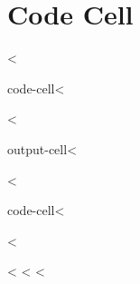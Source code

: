 \documentclass[letterpaper,10pt,english]{sphinxmanual}
\begin{document}
\section{Code Cell}
\label{\detokenize{code-block:code-cell}}
<%
\begin{sphinxuseclass}{code-cell}<%

\vspace{4mm}\vspace{-7mm}
\begin{sphinxVerbatim}[commandchars=\\\{\}]
 

\end{sphinxVerbatim}
<%
\end{sphinxuseclass}
\begin{sphinxuseclass}{output-cell}<%

\vspace{4mm}\llap{\color{nbsphinxout}\texttt{[1]:}\,\hspace{\fboxrule}\hspace{\fboxrule}\hspace{\fboxsep}}\vspace{-7mm}
\begin{sphinxVerbatim}[commandchars=\\\{\}]
 
\end{sphinxVerbatim}
<%
\end{sphinxuseclass}
\begin{sphinxuseclass}{code-cell}<%

\vspace{4mm}\vspace{-7mm}
\begin{sphinxVerbatim}[commandchars=\\\{\}]
 
\end{sphinxVerbatim}
<%
\end{sphinxuseclass}<%
<%
\sphinxstepscope
<%
\end{document}
